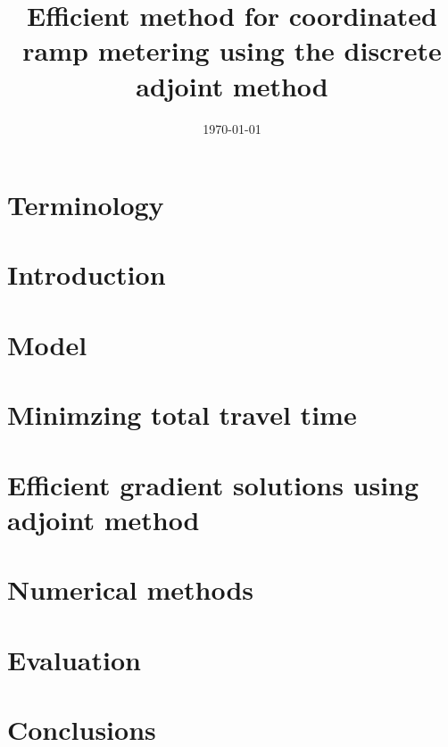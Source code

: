 \documentclass{article}
\begin{document}
\title{Efficient method for coordinated ramp metering using the discrete adjoint method}


\date{\today}

\maketitle

\begin{abstract}

\end{abstract}



\section*{Terminology}



\section{Introduction}\label{sec:introduction}


\section{Model} %
\label{sec:model}



\section{Minimzing total travel time} %
\label{sec:minimzing_total_travel_time}


\section{Efficient gradient solutions using adjoint method} %
\label{sec:efficient_gradient_solutions}



\section{Numerical methods} %
\label{sec:numerical_methods}



\section{Evaluation}\label{sec:evaluation}


\section{Conclusions}\label{sec:conclusions}






\end{document}
